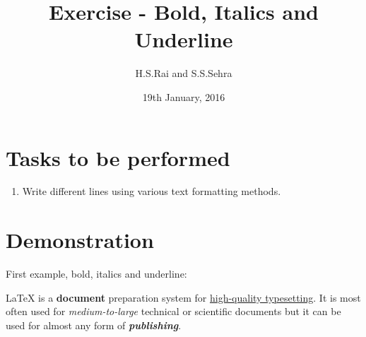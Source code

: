 \documentclass{article}
\title{Exercise  - Bold, Italics and Underline}
\author{H.S.Rai and S.S.Sehra}
\date{19th January, 2016}
\begin{document}
	\maketitle
	
	\section*{Tasks to be performed}
	\begin{enumerate}
		\item  Write different lines using various text formatting methods. 
	\end{enumerate}
	
\section*{Demonstration}

First example, bold, italics and underline:

LaTeX is a \textbf{document} preparation system for \underline{high-quality typesetting}. It is most often used for \textit{medium-to-large} technical or scientific documents but it can be used for almost any form of \textbf{\textit{publishing}}.
\end{document}
